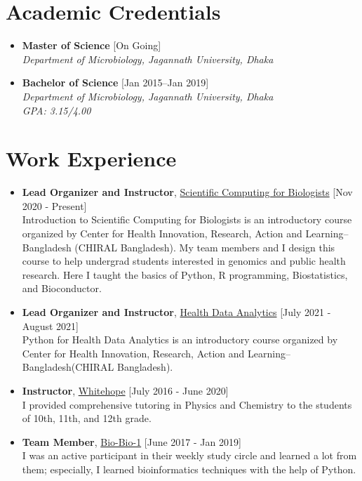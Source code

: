 \documentclass[11pt,a4paper]{moderncv}
\begin{document}
\hskip-2.5cm\makecvtitle
\section{Academic Credentials}
\begin{itemize}
\item \textbf{Master of Science} \hfill [On Going]\\
\textit{Department of Microbiology, Jagannath University, Dhaka}
\item \textbf{Bachelor of Science} \hfill [Jan 2015--Jan 2019]\\
\textit{Department of Microbiology, Jagannath University, Dhaka\\ GPA: 
3.15/4.00}
\end{itemize}

\section{Work Experience}
\begin{itemize}
	\item \textbf{Lead Organizer and Instructor}, 
	\textcolor{blue}{\href{https://scicomforbio.github.io/}{Scientific Computing for Biologists}} \hfil[Nov 2020 - Present] \\
	Introduction to Scientific Computing for Biologists is an introductory 
	course organized by Center for Health Innovation, Research, Action and Learning--Bangladesh (CHIRAL Bangladesh). My team members and I design this course to help  undergrad students interested in genomics and
	public health research. Here I taught the basics of Python, R programming, 
	Biostatistics, and Bioconductor.
	\item \textbf{Lead Organizer and Instructor}, 
	\textcolor{blue}{\href{https://scicomforbio.github.io/}{Health Data Analytics}} \hfil[July 2021 - August 2021] \\
	Python for Health Data Analytics is an introductory 
	course organized by Center for Health Innovation, Research, Action and Learning--Bangladesh(CHIRAL Bangladesh).
	\item \textbf{Instructor}, 
	\textcolor{blue}{\href{}{Whitehope}}
	\hfill [July 2016 - June 2020]\\ 
	I provided comprehensive tutoring in Physics and Chemistry to the 
	students of 10th, 11th, and 12th grade.
	
	\item \textbf{Team Member}, 
	\textcolor{blue}{\href{}{Bio-Bio-1}}
	\hfill [June 2017 - Jan 2019]\\ 
	I was an active participant in their weekly study circle and learned a lot 
	from them; especially, I learned bioinformatics techniques with the 
	help of Python.
	
\end{itemize}
\end{document}
